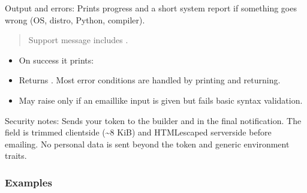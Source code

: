 \documentclass[letterpaper,10pt,english]{sphinxmanual}
\begin{document}
\begin{fulllineitems}
\begin{itemize}
\end{itemize}

\sphinxAtStartPar
Output and errors:
\sphinxhyphen{} Prints progress and a short system report if something goes wrong (OS, distro, Python, compiler).
\begin{quote}

\sphinxAtStartPar
Support message includes .
\end{quote}
\begin{itemize}
\item {} 
\sphinxAtStartPar
On success it prints:

\begin{sphinxVerbatim}[commandchars=\\\{\}]
           
\end{sphinxVerbatim}

\item {} 
\sphinxAtStartPar
Returns . Most error conditions are handled by printing and returning.

\item {} 
\sphinxAtStartPar
May raise  only if an email\sphinxhyphen{}like input is given but fails basic syntax validation.

\end{itemize}

\sphinxAtStartPar
Security notes:
\sphinxhyphen{} Sends your token to the builder and in the final notification.
\sphinxhyphen{} The  field is trimmed client\sphinxhyphen{}side (\textasciitilde{}8 KiB) and HTML\sphinxhyphen{}escaped server\sphinxhyphen{}side before emailing.
\sphinxhyphen{} No personal data is sent beyond the token and generic environment traits.
\subsubsection*{Examples}

\begin{sphinxVerbatim}[commandchars=\\\{\}]
 
  
\end{sphinxVerbatim}

\end{fulllineitems}
\end{document}
